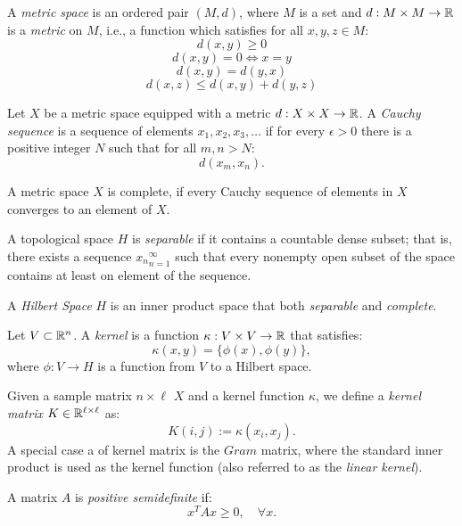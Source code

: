 \begin{definition}\label{def:notation:metric_space}
A \emph{metric space} is an ordered pair $(M,d)$, where $M$ is a set and $d: M \times M \rightarrow \mathbb{R}$ is a \emph{metric} on $M$, i.e., 
a function which satisfies for all $x,y,z \in M$:
$$d(x,y) \geq 0$$ 
$$d(x,y) = 0 \Longleftrightarrow x = y$$
$$d(x,y) = d(y,x)$$
$$d(x,z) \leq d(x,y) + d(y,z)$$
\end{definition}

\begin{definition}\label{def:notation:cauchy_sequence}
Let $X$ be a metric space equipped with a metric $d: X \times X \rightarrow \mathbb{R}$. A \emph{Cauchy sequence} is a sequence
of elements $x_1, x_2, x_3, \ldots$ if for every $\epsilon > 0$ there is a positive integer $N$ such
that for all $m,n > N$:
$$ d(x_m, x_n).$$
\end{definition}

\begin{definition}\label{def:notation:complete_space}
A metric space $X$ is complete, if every Cauchy sequence of elements in $X$ converges to an element of $X$.
\end{definition}

\begin{definition}\label{def:notation:separable_space}
A topological space $H$ is \emph{separable} if it contains a countable dense subset; that is, there
exists a sequence ${x_n}_{n=1}^{\infty}$ such that every nonempty open subset of the space contains at least
on element of the sequence.
\end{definition}

\begin{definition}\label{def:notation:hilbert_space}
A \emph{Hilbert Space} $H$ is an inner product space that both \emph{separable} and \emph{complete}. 
\end{definition}

\begin{definition}\label{def:notation:kernel_function}
Let $V \subset \mathbb{R}^n$. A \emph{kernel} is a function $\kappa: V \times V \rightarrow \mathbb{R}$ that satisfies:
$$ \kappa(x,y) = \lbrace \phi(x), \phi(y) \rbrace, $$
where $\phi: V \rightarrow H$ is a function from $V$ to a Hilbert space.
\end{definition}

\begin{definition}\label{def:notation:kernel_matrix}
Given a sample matrix $n\times\ell$ $X$ and a kernel function $\kappa$, we define a \emph{kernel matrix} $K \in \mathbb{R}^{\ell \times \ell}$ as:
$$ K(i,j) := \kappa(x_i, x_j).$$
A special case a of kernel matrix is the $Gram$ matrix, where the standard inner product is used as the kernel function (also referred to as the \emph{linear kernel}).
\end{definition}

\begin{definition}\label{def:notation:positive_semidefinite}
A matrix $A$ is \emph{positive semidefinite} if:
$$ x^T A x \geq 0,\quad \forall x.$$
\end{definition}

